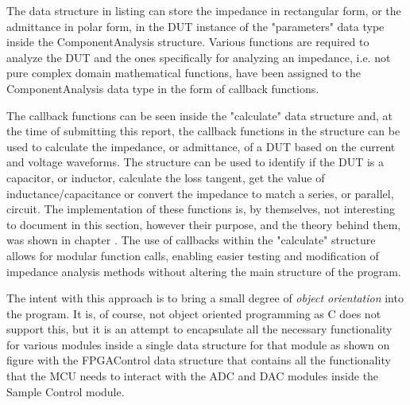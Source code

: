 The data structure in listing  can store the impedance in rectangular form, or the admittance in polar form, in the DUT instance of the "parameters" data type inside the ComponentAnalysis structure. Various functions are required to analyze the DUT and the ones specifically for analyzing an impedance, i.e. not pure complex domain mathematical functions, have been assigned to the ComponentAnalysis data type in the form of callback functions.

The callback functions can be seen inside the "calculate" data structure and, at the time of submitting this report, the callback functions in the structure can be used to calculate the impedance, or admittance, of a DUT based on the current and voltage waveforms. The structure can be used to identify if the DUT is a capacitor, or inductor, calculate the loss tangent, get the value of inductance/capacitance or convert the impedance to match a series, or parallel, circuit. The implementation of these functions is, by themselves, not interesting to document in this section, however their purpose, and the theory behind them, was shown in chapter . The use of callbacks within the "calculate" structure allows for modular function calls, enabling easier testing and modification of impedance analysis methods without altering the main structure of the program.

The intent with this approach is to bring a small degree of \textit{object orientation} into the program. It is, of course, not object oriented programming as C does not support this, but it is an attempt to encapsulate all the necessary functionality for various modules inside a single data structure for that module as shown on figure  with the FPGAControl data structure that contains all the functionality that the MCU needs to interact with the ADC and DAC modules inside the Sample Control module.

